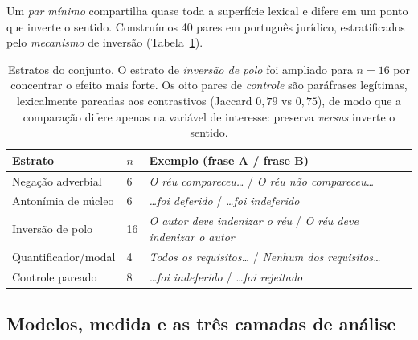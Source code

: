 \documentclass[11pt]{article}
\begin{document}
Um \emph{par mínimo} compartilha quase toda a superfície lexical e difere em um
ponto que inverte o sentido. Construímos 40 pares em português jurídico,
estratificados pelo \emph{mecanismo} de inversão (Tabela~\ref{tab:estratos}).

\begin{table}[H]
\centering
\small
\begin{tabular}{lll}
\toprule
Estrato & $n$ & Exemplo (frase A / frase B) \\
\midrule
Negação adverbial & 6 & \emph{O réu compareceu\ldots} / \emph{O réu não compareceu\ldots} \\
Antonímia de núcleo & 6 & \emph{\ldots foi deferido} / \emph{\ldots foi indeferido} \\
Inversão de polo & 16 & \emph{O autor deve indenizar o réu} / \emph{O réu deve indenizar o autor} \\
Quantificador/modal & 4 & \emph{Todos os requisitos\ldots} / \emph{Nenhum dos requisitos\ldots} \\
Controle pareado & 8 & \emph{\ldots foi indeferido} / \emph{\ldots foi rejeitado} \\
\bottomrule
\end{tabular}
\caption{Estratos do conjunto. O estrato de \emph{inversão de polo} foi ampliado
para $n=16$ por concentrar o efeito mais forte. Os oito pares de \emph{controle}
são paráfrases legítimas, lexicalmente pareadas aos contrastivos (Jaccard
$0{,}79$ vs $0{,}75$), de modo que a comparação difere apenas na variável de
interesse: preserva \emph{versus} inverte o sentido.}
\label{tab:estratos}
\end{table}

\subsection{Modelos, medida e as três camadas de análise}
\end{document}
